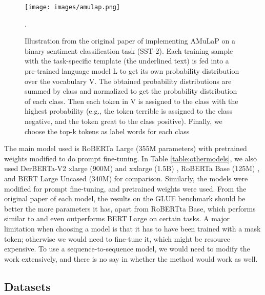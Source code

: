 \begin{figure}[htp]
    \centering
    \texttt{[image: images/amulap.png]}
    \caption{Illustration from the original paper of implementing AMuLaP on a binary sentiment classification task (SST-2). Each training sample with the task-specific template (the underlined text) is fed into a pre-trained language model L to get its own probability distribution over the vocabulary V. The obtained probability distributions are summed by class and normalized to get the probability distribution of each class. Then each token in V is assigned to the class with the highest probability (e.g., the token terrible is assigned to the class negative, and the token great to the class positive). Finally, we choose the top-k tokens as label words for each class \citep{Wang}}.
    \label{fig:amu}
\end{figure}

\hfill \break
The main model used is RoBERTa Large (355M parameters) \citep{roberta} with pretrained weights modified to do prompt fine-tuning. In Table \ref{table:othermodels}, we also used DerBERTa-V2 xlarge (900M) and xxlarge (1.5B) \citep{deberta}, RoBERTa Base (125M) \citep{roberta}, and BERT Large Uncased (340M) \citep{devlin-etal-2019-bert} for comparison. Similarly, the models were modified for prompt fine-tuning, and pretrained weights were used. From the original paper of each model, the results on the GLUE benchmark \citep{wang-etal-2018-glue} should be better the more parameters it has, apart from RoBERTta Base, which performs similar to and even outperforms BERT Large on certain tasks. A major limitation when choosing a model is that it has to have been trained with a mask token; otherwise we would need to fine-tune it, which might be resource expensive. To use a sequence-to-sequence model, we would need to modify the work extensively, and there is no say in whether the method would work as well.


\subsection{Datasets}

